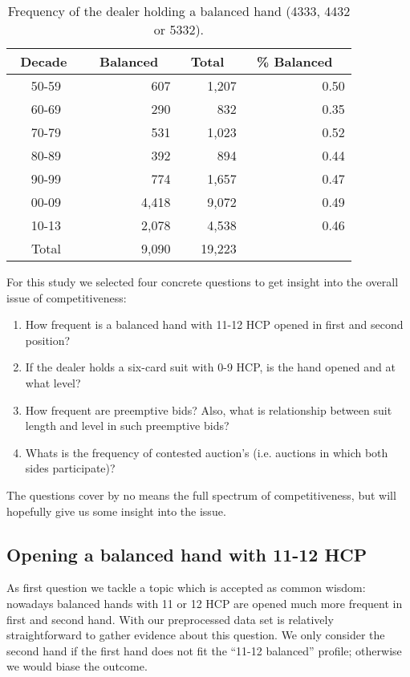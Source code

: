 \documentclass{llncs}
\begin{document}
\begin{table}
\caption{Frequency of the dealer holding a balanced hand (4333, 4432
  or 5332).} 
\label{tbl:balanced-first-hand}
\centering\footnotesize
\begin{tabular}{|c|r|r|r|}
\hline
\bf \ Decade \ & \bf \ Balanced \ & \bf \ Total \  & \bf \ \% Balanced \ \\ \hline 
50-59 & 607 & 1,207 & 0.50 \\
60-69 & 290 & 832 & 0.35 \\
70-79 & 531 & 1,023 & 0.52 \\
80-89 & 392 & 894 & 0.44 \\
90-99 & 774 & 1,657 & 0.47 \\
00-09 & 4,418 & 9,072 & 0.49 \\
10-13 & 2,078 & 4,538 & 0.46 \\ 
\hline
Total & 9,090 & 19,223 &  \\
\hline
\end{tabular}
\end{table}

For this study we selected four concrete questions to get insight into the
overall issue of competitiveness: 
\begin{enumerate}
\item How frequent is a balanced hand with 11-12 HCP opened in first
  and second position?
\item If the dealer holds a six-card suit with 0-9 HCP, is the hand
  opened and at what level? 
\item How frequent are preemptive bids? Also, what is relationship
  between suit length and level in such preemptive bids? 
\item Whats is the frequency of contested auction's (i.e. auctions in
  which both sides participate)?   
\end{enumerate}

The questions cover by no means the full spectrum of competitiveness,
but will hopefully give us some insight into the issue.   

\subsection{Opening a balanced hand with 11-12 HCP}

As first question we tackle a topic which is accepted as common wisdom:
nowadays balanced hands with 11 or 12 HCP are opened much more
frequent 
in first and second hand.  With our preprocessed data set is
relatively straightforward to gather evidence about this question. 
We only consider the second hand if the
first hand does not fit the ``11-12 balanced'' profile; otherwise we
would  biase the outcome. 
\end{document}
